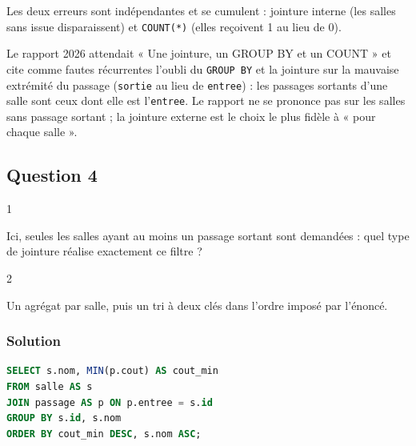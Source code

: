 \documentclass[11pt,a4paper]{article}
\begin{document}
\begin{piege}

Les deux erreurs sont indépendantes et se cumulent : jointure interne (les salles sans issue disparaissent) et \texttt{COUNT(*)} (elles reçoivent 1 au lieu de 0).

\end{piege}

\begin{jury}

Le rapport 2026 attendait « Une jointure, un GROUP BY et un COUNT » et cite comme fautes récurrentes l'oubli du \texttt{GROUP\ BY} et la jointure sur la mauvaise extrémité du passage (\texttt{sortie} au lieu de \texttt{entree}) : les passages sortants d'une salle sont ceux dont elle est l'\texttt{entree}. Le rapport ne se prononce pas sur les salles sans passage sortant ; la jointure externe est le choix le plus fidèle à « pour chaque salle ».

\end{jury}

\hypertarget{question-4}{%
\subsection{Question 4}\label{question-4}}

\begin{indication}{1}

Ici, seules les salles ayant au moins un passage sortant sont demandées : quel type de jointure réalise exactement ce filtre ?

\end{indication}

\begin{indication}{2}

Un agrégat par salle, puis un tri à deux clés dans l'ordre imposé par l'énoncé.

\end{indication}

\hypertarget{solution-3}{%
\subsubsection{Solution}\label{solution-3}}

\begin{lstlisting}[language=SQL]
SELECT s.nom, MIN(p.cout) AS cout_min
FROM salle AS s
JOIN passage AS p ON p.entree = s.id
GROUP BY s.id, s.nom
ORDER BY cout_min DESC, s.nom ASC;
\end{lstlisting}
\end{document}
